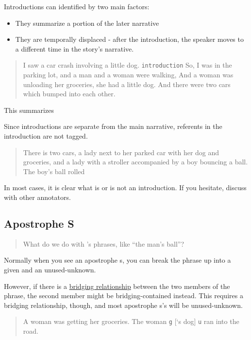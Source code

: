 \documentclass[
]{book}
\providecommand{\tightlist}{%
  \setlength{\itemsep}{0pt}\setlength{\parskip}{0pt}}
\begin{document}
Introductions can identified by two main factors:

\begin{itemize}
\tightlist
\item
  They summarize a portion of the later narrative
\item
  They are temporally displaced - after the introduction,
  the speaker moves to a different time in the story's narrative.
\end{itemize}

\begin{quote}
I saw a car crash involving a little dog. \texttt{introduction}
So, I was in the parking lot, and a man and a woman were walking,
And a woman was unloading her groceries, she had a little dog.
And there were two cars which bumped into each other.
\end{quote}

This summarizes

Since introductions are separate from the main narrative,
referents in the introduction are not tagged.

\begin{quote}
There is two cars,
a lady next to her parked car with her dog and groceries,
and a lady with a stroller accompanied by a boy bouncing a ball.
The boy's ball rolled
\end{quote}

In most cases, it is clear what is or is not an introduction.
If you hesitate, discuss with other annotators.

\hypertarget{apostrophe-s}{%
\subsection{Apostrophe S}\label{apostrophe-s}}

\begin{quote}
What do we do with 's phrases, like ``the man's ball''?
\end{quote}

Normally when you see an apostrophe s, you can break the phrase up into a given and an unused-unknown.

However, if there is a \protect\hyperlink{bridging-relationships}{bridging relationship} between the two members of the phrase, the second member might be bridging-contained instead.
This requires a bridging relationship, though, and most apostrophe s's will be unused-unknown.

\begin{quote}
A woman was getting her groceries.
The woman \texttt{g} {[}`s dog{]} \texttt{u} ran into the road.
\end{quote}
\end{document}
